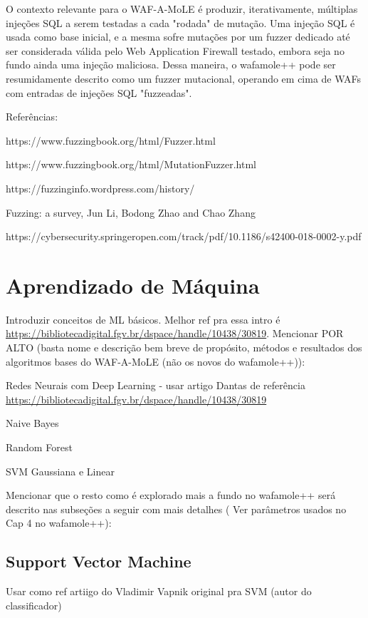O contexto relevante para o WAF-A-MoLE é produzir, iterativamente, múltiplas injeções SQL a serem testadas a cada "rodada" de mutação. Uma injeção SQL é usada como base inicial, e a mesma sofre mutações por um fuzzer dedicado até ser considerada válida pelo Web Application Firewall testado, embora seja no fundo ainda uma injeção maliciosa. Dessa maneira, o wafamole++ pode ser resumidamente descrito como um fuzzer mutacional, operando em cima de WAFs com entradas de injeções SQL "fuzzeadas".

Referências:

https://www.fuzzingbook.org/html/Fuzzer.html

https://www.fuzzingbook.org/html/MutationFuzzer.html

https://fuzzinginfo.wordpress.com/history/

Fuzzing: a survey, Jun Li, Bodong Zhao and Chao Zhang

https://cybersecurity.springeropen.com/track/pdf/10.1186/s42400-018-0002-y.pdf

\section{Aprendizado de Máquina}
Introduzir conceitos de ML básicos. Melhor ref pra essa intro é \href{link}{https://bibliotecadigital.fgv.br/dspace/handle/10438/30819}. Mencionar POR ALTO (basta nome e descrição bem breve de propósito, métodos e resultados dos algoritmos bases do WAF-A-MoLE (não os novos do wafamole++)):
\begin{alineas}
\item Redes Neurais com Deep Learning - usar artigo Dantas de referência \href{link}{https://bibliotecadigital.fgv.br/dspace/handle/10438/30819}
\item Naive Bayes
\item Random Forest
\item SVM Gaussiana e Linear
\end{alineas}

Mencionar que o resto como é explorado mais a fundo no wafamole++ será descrito nas subseções a seguir com mais detalhes ( Ver parâmetros usados no Cap 4 no wafamole++): 

\subsection{Support Vector Machine}

Usar como ref artiigo do Vladimir Vapnik original pra SVM (autor do classificador)

